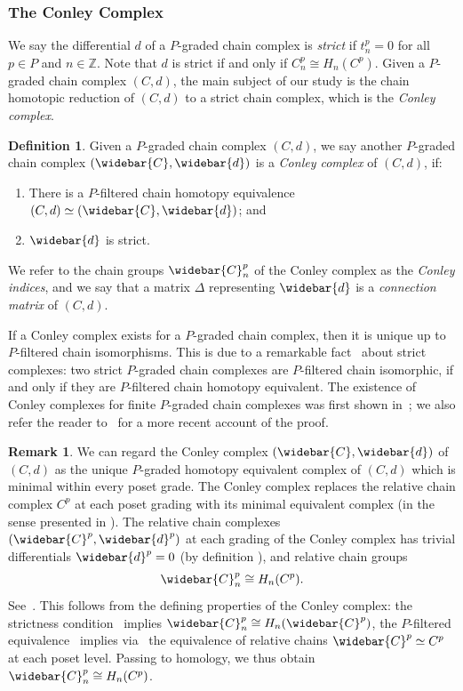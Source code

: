 \documentclass[11pt, table, nothms]{amsart}
\theoremstyle{definition}
\newtheorem{definition}[theorem]{Definition}
\newtheorem{remark}[theorem]{Remark}
\newcommand{\rH}{H}
\newcommand{\Z}{\mathbb{Z}}
\newcommand{\C}{C}
\newcommand{\oC}{\widebar{C}}
\newcommand{\od}{\widebar{d}}
\begin{document}
{%
\subsubsection{The Conley Complex}
We say the differential $d$ of a $P$-graded chain complex is \emph{strict} if $t^p_n = 0$ for all $p \in P$ and $n \in \Z$. Note that $d$ is strict if and only if $\C^p_n \cong H_n(\C^p)$. Given a $P$-graded chain complex $(C,d)$, the main subject of our study is the chain homotopic reduction of $(C,d)$ to a strict chain complex, which is the \emph{Conley complex}. 

\begin{definition} \label{def:connection_matrix} Given a $P$-graded chain complex $(C,d)$, we say another $P$-graded chain complex $(\oC, \od)$ is a \emph{Conley complex} of $(C,d)$, if:
\begin{enumerate}[label = \emph{(M\arabic*)}, ref = (M\arabic*)]
    \item \label{M1} There is a $P$-filtered chain homotopy equivalence $(C,d) \simeq (\oC, \od)$; and
    \item  \label{M2} $\od$ is strict.
\end{enumerate}
We refer to the chain groups $\oC^p_n$ of the Conley complex as the \emph{Conley indices}, and we say that a matrix $\Delta$ representing  $\od$ is
a \emph{connection matrix} of $(C,d)$.
\end{definition}
If a Conley complex exists for a $P$-graded chain complex, then it is unique up to $P$-filtered chain isomorphisms. 
This is due to a remarkable fact~\cite[Proposition 4.27]{harker2021} about strict complexes: two strict $P$-graded chain complexes are $P$-filtered chain isomorphic, if and only if they are $P$-filtered chain homotopy equivalent. 
The existence of Conley complexes for finite $P$-graded chain complexes was first shown in~\cite[Theorem 8.1, Cor. 8.2]{Robbin1992LyapunovFunctor}; we also refer the reader to~\cite[Lemma 5.3.1, Theorem 5.3.2]{Mrozek2025ConnectionDynamics} for a more recent account of the proof.


\begin{remark} \label{rmk:con_index}
    We can regard the Conley complex $(\oC, \od)$ of $(C,d)$ as the unique $P$-graded homotopy equivalent complex of $(C,d)$ which is minimal within every poset grade. The Conley complex replaces the relative chain complex $\C^p$ at each poset grading with its minimal equivalent complex (in the sense presented in ). The relative chain complexes $(\oC^p, \od^p)$ at each grading of the Conley complex has trivial differentials $\od^p = 0$ (by definition ), and relative chain groups 
     \[\oC^p_n \cong \rH_n(\C^p). \] See~\cite[\S 8]{Robbin1992LyapunovFunctor}. This follows from the defining properties of the Conley complex: the strictness condition~ implies $\oC^p_n \cong \rH_n(\oC^p)$, the $P$-filtered equivalence~ implies via~ the equivalence of relative chains $\oC^p \simeq \C^p$ at each poset level. Passing to homology, we thus obtain $\oC^p_n \cong \rH_n(\C^p)$. 
\end{remark}


}
\end{document}
